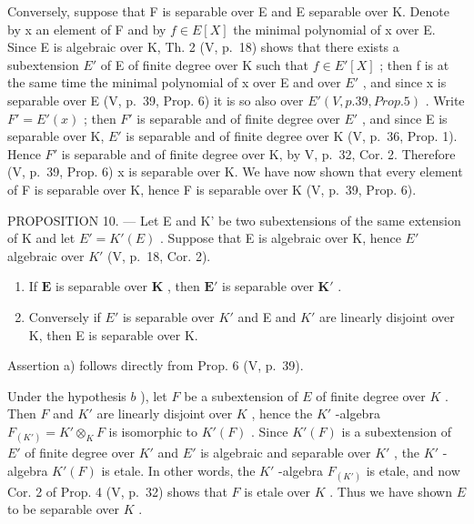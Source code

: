 Conversely, suppose that F is separable over E and E separable over K. Denote by x an element of F and by \(f \in E[X]\) the minimal polynomial of x over E. Since E is algebraic over K, Th. 2 (V, p.~18) shows that there exists a subextension \(E'\) of E of finite degree over K such that \(f \in E'[X]\) ; then f is at the same time the minimal polynomial of x over E and over \(E'\) , and since x is separable over E (V, p.~39, Prop. 6) it is so also over \(E'(V, p. 39, Prop. 5)\) . Write \(F' = E'(x)\) ; then \(F'\) is separable and of finite degree over \(E'\) , and since E is separable over K, \(E'\) is separable and of finite degree over K (V, p.~36, Prop. 1). Hence \(F'\) is separable and of finite degree over K, by V, p.~32, Cor. 2. Therefore (V, p.~39, Prop. 6) x is separable over K. We have now shown that every element of F is separable over K, hence F is separable over K (V, p.~39, Prop. 6).

PROPOSITION 10. --- Let E and K' be two subextensions of the same extension of K and let \(E' = K'(E)\) . Suppose that E is algebraic over K, hence \(E'\) algebraic over \(K'\) (V, p.~18, Cor. 2).

\begin{enumerate}
\def\labelenumi{\alph{enumi})}
\item
  If \(\mathbf{E}\) is separable over \(\mathbf{K}\) , then \(\mathbf{E}'\) is separable over \(\mathbf{K}'\) .
\item
  Conversely if \(E'\) is separable over \(K'\) and E and \(K'\) are linearly disjoint over K, then E is separable over K.
\end{enumerate}

Assertion a) follows directly from Prop. 6 (V, p.~39).

Under the hypothesis \(b\) ), let \(F\) be a subextension of \(E\) of finite degree over \(K\) . Then \(F\) and \(K'\) are linearly disjoint over \(K\) , hence the \(K'\) -algebra \(F_{(K')} = K' \otimes_K F\) is isomorphic to \(K'(F)\) . Since \(K'(F)\) is a subextension of \(E'\) of finite degree over \(K'\) and \(E'\) is algebraic and separable over \(K'\) , the \(K'\) -algebra \(K'(F)\) is etale. In other words, the \(K'\) -algebra \(F_{(K')}\) is etale, and now Cor. 2 of Prop. 4 (V, p.~32) shows that \(F\) is etale over \(K\) . Thus we have shown \(E\) to be separable over \(K\) .
